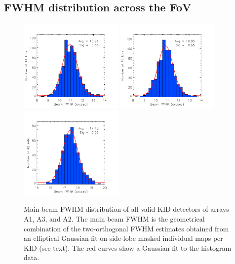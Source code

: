 \subsection{FWHM distribution across the FoV}

\begin{figure}[ht!]
  \centering
  \includegraphics[clip=true,width=0.45\textwidth]{../../../Paper_NIKA2_Technical/plot_histo_A1_fwhm_20170424s123.pdf}
  \includegraphics[clip=true,width=0.45\textwidth]{../../../Paper_NIKA2_Technical/plot_histo_A3_fwhm_20170424s123.pdf}
  \includegraphics[clip=true,width=0.45\textwidth]{../../../Paper_NIKA2_Technical/plot_histo_A2_fwhm_20170424s123.pdf}
  
\caption[Main beam FWHM distribution across the array]{Main beam FWHM distribution of all valid KID detectors of arrays A1, A3, and A2. The main beam FWHM is the geometrical combination of the two-orthogonal FWHM estimates obtained from an elliptical Gaussian fit on side-lobe masked individual maps per KID (see text). The red curves show a Gaussian fit to the histogram data.}
  \label{fig:focalplane_histo}
\end{figure}

